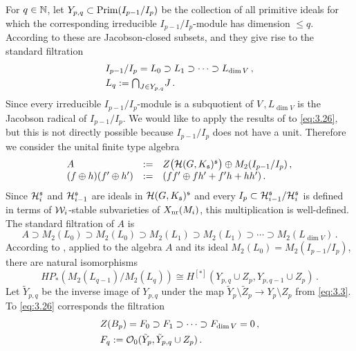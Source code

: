 For $q \in \mathbb N$, let $Y_{p,q} \subset \mathrm{Prim}(I_{p-1}/I_p)$ be the collection of all primitive
ideals for which the corresponding irreducible $I_{p-1}/I_p $-module has dimension $\leq q$. 
According to \cite[p. 328]{KNS} these are Jacobson-closed subsets, and they give rise to 
the standard filtration
\begin{equation}\label{eq:3.26}
\begin{split}
& I_{p-1}/I_p = L_0 \supset L_1 \supset \cdots \supset L_{\dim V} \,, \\
& L_q := {\textstyle \bigcap_{J \in Y_{p,q}} } J \,. \\
\end{split}
\end{equation}
Since every irreducible $I_{p-1}/I_p$-module is a subquotient of $V \,, L_{\dim V}$ is the 
Jacobson radical of $I_{p-1}/I_p$. We would like to apply the results of \cite{KNS} to 
\eqref{eq:3.26}, but this is not directly possible because $I_{p-1}/I_p$ does not have a unit. 
Therefore we consider the unital finite type algebra
\[
\begin{array}{lll}
A & := & Z \big( \mathcal H (G,K_{\mathfrak s})^{\mathfrak s} \big) \oplus M_2 (I_{p-1}/I_p ) \,, \\
(f \oplus h) (f' \oplus h') & := & (ff' \oplus fh' + f' h + hh' ) \,.
\end{array}
\]
Since $\mathcal H_i^{\mathfrak s}$ and $\mathcal H_{i-1}^{\mathfrak s}$ are ideals in $\mathcal H (G,K_{\mathfrak s})^{\mathfrak s}$ and
every $I_p \subset \mathcal H^{\mathfrak s}_{i-1} / \mathcal H^{\mathfrak s}_i$ is defined in terms of $\mathcal W_i$-stable
subvarieties of $X_{\mathrm{nr}} (M_i )$, this multiplication is well-defined.
The standard filtration of $A$ is
\[
A \supset M_2 (L_0) \supset M_2 (L_0 ) \supset M_2 (L_1) \supset M_2 (L_1) \supset \cdots \supset 
M_2 (L_{\dim V}) \,.
\]
According to \cite[Proposition 1 and Theorem 10]{KNS}, applied to the algebra $A$ and its ideal
$M_2 (L_0 ) = M_2 (I_{p-1}/I_p )$, there are natural isomorphisms
\begin{equation}\label{eq:3.27}
HP_* (M_2 (L_{q-1}) / M_2 (L_q) ) \cong H^{[*]} (Y_{p,q} \cup Z_p ,Y_{p,q-1} \cup Z_p ) \,.
\end{equation}
Let $\tilde Y_{p,q}$ be the inverse image of $Y_{p,q}$ under the map $\tilde Y_p \setminus \tilde Z_p
\to Y_p \setminus Z_p$ from \eqref{eq:3.3}. To \eqref{eq:3.26} corresponds the filtration
\begin{align*}
& Z(B_p) = F_0 \supset F_1 \supset \cdots \supset F_{\dim V} = 0 \,, \\
& F_q := \mathcal O_0 (\tilde Y_p , \tilde Y_{p,q} \cup Z_p ) \,.
\end{align*}
